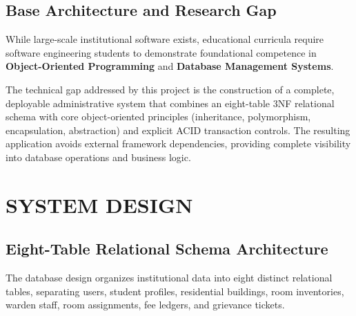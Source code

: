\documentclass[12pt,a4paper]{report}
\begin{document}
\section{Base Architecture and Research Gap}
While large-scale institutional software exists, educational curricula require software engineering students to demonstrate foundational competence in \textbf{Object-Oriented Programming} and \textbf{Database Management Systems}. 

The technical gap addressed by this project is the construction of a complete, deployable administrative system that combines an eight-table 3NF relational schema with core object-oriented principles (inheritance, polymorphism, encapsulation, abstraction) and explicit ACID transaction controls. The resulting application avoids external framework dependencies, providing complete visibility into database operations and business logic.

\newpage

\chapter{SYSTEM DESIGN}

\section{Eight-Table Relational Schema Architecture}
The database design organizes institutional data into eight distinct relational tables, separating users, student profiles, residential buildings, room inventories, warden staff, room assignments, fee ledgers, and grievance tickets.
\end{document}
